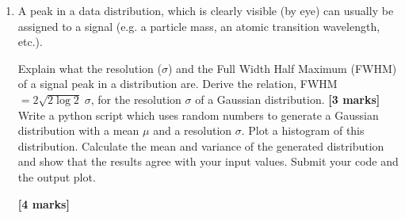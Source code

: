 \begin{enumerate}
\item A peak in a data distribution, which is clearly visible (by eye) can usually be assigned to a signal (e.g. a particle mass, an atomic transition wavelength, etc.).

Explain what the resolution ($\sigma$) and the Full Width Half Maximum (FWHM) of a signal peak in a distribution are.
Derive the relation, FWHM$ = 2 \sqrt{2 \log 2}\; \sigma$, for the resolution $\sigma$ of a Gaussian distribution.
\hfill {\bf [3 marks]}\\

Write a python script which uses random numbers to generate a Gaussian distribution with a mean $\mu$ and a resolution $\sigma$.
Plot a histogram of this distribution.
Calculate the mean and variance of the generated distribution and show that the results agree with your input values.
Submit your code and the output plot.

\hfill {\bf [4 marks]}



\begin{comment}
\item Write a short python script which generates a flat distribution and plots a histogram of the distribution.
Calculate the mean and variance of the generated distribution and show that for a flat distribution between $a$ and $b$, the relation $\sigma = \frac{b-a}{\sqrt{12}}$ for the resolution $\sigma$ is satisfied.
You need to submit your code.

Derive the relation $\sigma = \frac{b-a}{\sqrt{12}}$ for the resolution $\sigma$ of a flat distribution between $a$ and $b$.

\hfill {\bf [6 marks]}
\end{comment}

\end{enumerate}
